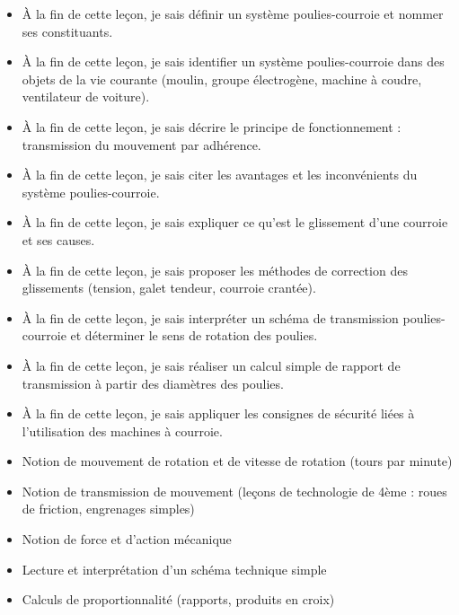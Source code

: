 \documentclass[11pt]{article}
\begin{document}
\begin{objectifs}
\begin{itemize}
\item À la fin de cette leçon, je sais définir un système poulies-courroie et nommer ses constituants.
\item À la fin de cette leçon, je sais identifier un système poulies-courroie dans des objets de la vie courante (moulin, groupe électrogène, machine à coudre, ventilateur de voiture).
\item À la fin de cette leçon, je sais décrire le principe de fonctionnement : transmission du mouvement par adhérence.
\item À la fin de cette leçon, je sais citer les avantages et les inconvénients du système poulies-courroie.
\item À la fin de cette leçon, je sais expliquer ce qu'est le glissement d'une courroie et ses causes.
\item À la fin de cette leçon, je sais proposer les méthodes de correction des glissements (tension, galet tendeur, courroie crantée).
\item À la fin de cette leçon, je sais interpréter un schéma de transmission poulies-courroie et déterminer le sens de rotation des poulies.
\item À la fin de cette leçon, je sais réaliser un calcul simple de rapport de transmission à partir des diamètres des poulies.
\item À la fin de cette leçon, je sais appliquer les consignes de sécurité liées à l'utilisation des machines à courroie.
\end{itemize}
\end{objectifs}

\begin{prerequis}
\begin{itemize}
\item Notion de mouvement de rotation et de vitesse de rotation (tours par minute)
\item Notion de transmission de mouvement (leçons de technologie de 4ème : roues de friction, engrenages simples)
\item Notion de force et d'action mécanique
\item Lecture et interprétation d'un schéma technique simple
\item Calculs de proportionnalité (rapports, produits en croix)
\end{itemize}
\end{prerequis}
\end{document}
